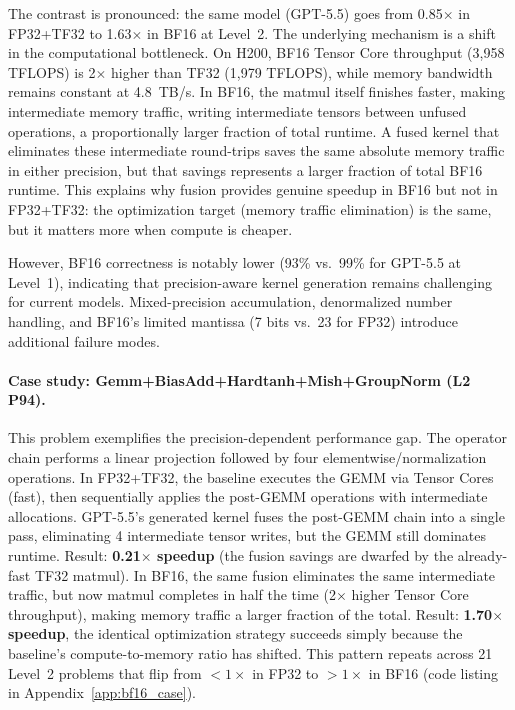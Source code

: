 \documentclass[11pt]{article}
\begin{document}
The contrast is pronounced: the same model (GPT-5.5) goes from 0.85$\times$ in FP32+TF32 to 1.63$\times$ in BF16 at Level~2. The underlying mechanism is a shift in the computational bottleneck. On H200, BF16 Tensor Core throughput (3,958 TFLOPS) is 2$\times$ higher than TF32 (1,979 TFLOPS), while memory bandwidth remains constant at 4.8~TB/s. In BF16, the matmul itself finishes faster, making intermediate memory traffic, writing intermediate tensors between unfused operations, a proportionally larger fraction of total runtime. A fused kernel that eliminates these intermediate round-trips saves the same absolute memory traffic in either precision, but that savings represents a larger fraction of total BF16 runtime. This explains why fusion provides genuine speedup in BF16 but not in FP32+TF32: the optimization target (memory traffic elimination) is the same, but it matters more when compute is cheaper.

However, BF16 correctness is notably lower (93\% vs.\ 99\% for GPT-5.5 at Level~1), indicating that precision-aware kernel generation remains challenging for current models. Mixed-precision accumulation, denormalized number handling, and BF16's limited mantissa (7 bits vs.\ 23 for FP32) introduce additional failure modes.

\paragraph{Case study: Gemm+BiasAdd+Hardtanh+Mish+GroupNorm (L2 P94).}
This problem exemplifies the precision-dependent performance gap. The operator chain performs a linear projection followed by four elementwise/normalization operations. In FP32+TF32, the baseline executes the GEMM via Tensor Cores (fast), then sequentially applies the post-GEMM operations with intermediate allocations. GPT-5.5's generated kernel fuses the post-GEMM chain into a single pass, eliminating 4 intermediate tensor writes, but the GEMM still dominates runtime. Result: \textbf{0.21$\times$ speedup} (the fusion savings are dwarfed by the already-fast TF32 matmul). In BF16, the same fusion eliminates the same intermediate traffic, but now matmul completes in half the time (2$\times$ higher Tensor Core throughput), making memory traffic a larger fraction of the total. Result: \textbf{1.70$\times$ speedup}, the identical optimization strategy succeeds simply because the baseline's compute-to-memory ratio has shifted. This pattern repeats across 21 Level~2 problems that flip from $<1\times$ in FP32 to $>1\times$ in BF16 (code listing in Appendix~\ref{app:bf16_case}).
\end{document}
